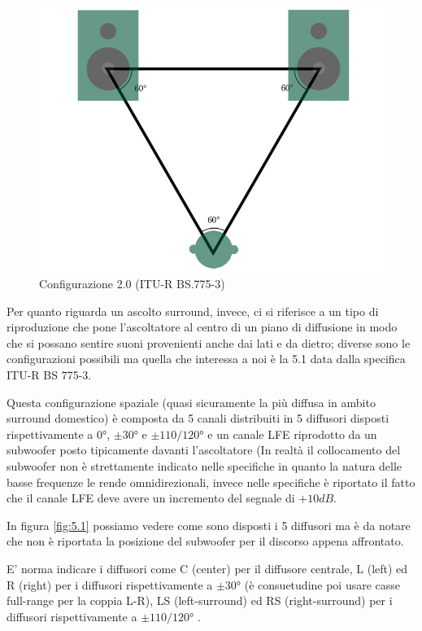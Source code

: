 \documentclass[12pt,a4paper]{report}
\begin{document}
\begin{figure}[htbp]
	\centering
	\includegraphics[scale=0.30]{figures/stereo.jpg}
	\caption {Configurazione 2.0 (ITU-R BS.775-3)}
	\label{fig:2.0}
	\end{figure}
	
Per quanto riguarda un ascolto surround, invece, ci si riferisce a un tipo di riproduzione che pone l'ascoltatore al centro di un piano di diffusione in modo che si possano sentire suoni provenienti anche dai lati e da dietro; diverse sono le configurazioni possibili ma quella che interessa a noi è la 5.1 data dalla specifica ITU-R BS 775-3\cite{5.1}.

Questa configurazione spaziale (quasi sicuramente la più diffusa in ambito surround domestico) è composta da 5 canali distribuiti in 5 diffusori disposti rispettivamente a $0°$, $\pm30°$ e $\pm110/120°$ e un canale LFE riprodotto da un subwoofer posto tipicamente davanti l'ascoltatore (In realtà il collocamento del subwoofer non è strettamente indicato nelle specifiche in quanto la natura delle basse frequenze le rende omnidirezionali, invece nelle specifiche è riportato il fatto che il canale LFE deve avere un incremento del segnale di $+10dB$.

In figura \ref{fig:5.1} possiamo vedere come sono disposti i 5 diffusori ma è da notare che non è riportata la posizione del subwoofer per il discorso appena affrontato.

E' norma indicare i diffusori come C (center) per il diffusore centrale, L (left) ed R (right) per i diffusori rispettivamente a $\pm30°$ (è consuetudine poi usare casse full-range per la coppia L-R), LS (left-surround) ed RS (right-surround) per i diffusori rispettivamente a $\pm110/120°$ .
\end{document}

